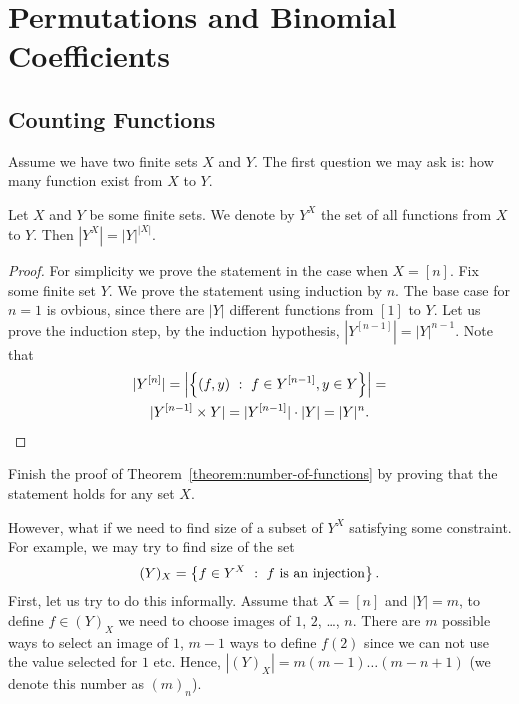 \chapter{Permutations and Binomial Coefficients}
\section{Counting Functions}
Assume we have two finite sets $X$ and $Y$. The first question we may ask is:
how many function exist from $X$ to $Y$.


\begin{theorem}
\label{theorem:number-of-functions}
  Let $X$ and $Y$ be some finite sets. We denote by $Y^X$ the set of all
  functions from $X$ to $Y$. Then $|Y^X| = |Y|^{|X|}$.
\end{theorem}
\begin{proof}
  For simplicity we prove the statement in the case when $X = [n]$. Fix some
  finite set $Y$. We prove the statement using induction by $n$. The base case
  for $n = 1$ is ovbious, since there are $|Y|$ different functions from $[1]$
  to $Y$. Let us prove the induction step, by the induction hypothesis,
  $|Y^{[n - 1]}| = |Y|^{n - 1}$. Note that
  \begin{multline*}
    |Y^{[n]}| = \left| \set[f \in Y^{[ n - 1]}, y \in Y]{(f, y)} \right| = \\
    |Y^{[n - 1]} \times Y| = |Y^{[n - 1]}| \cdot |Y| = |Y|^n.
  \end{multline*}
\end{proof}

\begin{exercise}
  Finish the proof of Theorem~\ref{theorem:number-of-functions} by proving that
  the statement holds for any set $X$.
\end{exercise}

However, what if we need to find size of a subset of $Y^X$ satisfying some
constraint. For example, we may try to find size of the set
\[
  (Y)_X = \set[f\text{ is an injection}]{f \in Y^X}.
\]
First, let us try to do this informally. Assume that $X = [n]$ and $|Y| = m$,
to define $f \in (Y)_X$ we need to choose images of $1$, $2$, \dots, $n$. There
are $m$ possible ways to select an image of $1$, $m - 1$ ways to define $f(2)$
since we can not use the value selected for $1$ etc. Hence,
$|(Y)_X| = m (m - 1) \dots (m - n + 1)$ (we denote this number as $(m)_n$).

